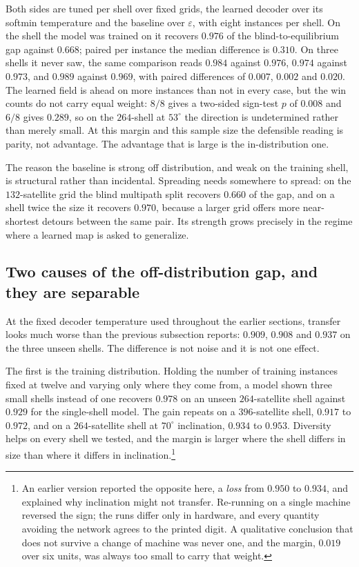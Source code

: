 \documentclass[journal]{IEEEtran}
\begin{document}
Both sides are tuned per shell over fixed grids, the learned decoder over its softmin temperature
and the baseline over $\varepsilon$, with eight instances per shell. On the shell the model was
trained on it recovers $0.976$ of the blind-to-equilibrium gap against $0.668$; paired per instance the median difference is $0.310$. On three shells it never saw, the same comparison reads $0.984$
against $0.976$, $0.974$ against $0.973$, and $0.989$ against $0.969$, with paired differences of
$0.007$, $0.002$ and $0.020$. The learned field is ahead on more instances than not in every case,
but the win counts do not carry equal weight: $8/8$ gives a two-sided sign-test $p$ of $0.008$ and
$6/8$ gives $0.289$, so on the $264$-shell at $53^\circ$ the direction is undetermined rather than
merely small. At this margin and this sample size the defensible reading is parity, not advantage.
The
advantage that is large is the in-distribution one.

The reason the baseline is strong off distribution, and weak on the training shell, is structural
rather than incidental. Spreading needs somewhere to spread: on the $132$-satellite grid the
blind multipath split recovers $0.660$ of the gap, and on a shell twice the size it recovers
$0.970$, because a larger grid offers more near-shortest detours between the same pair. Its
strength grows precisely in the regime where a learned map is asked to generalize.

\subsection{Two causes of the off-distribution gap, and they are separable}\label{sec:two-causes}

At the fixed decoder temperature used throughout the earlier sections, transfer looks much worse
than the previous subsection reports: $0.909$, $0.908$ and $0.937$ on the three unseen shells.
The difference is not noise and it is not one effect.

The first is the training distribution. Holding the number of training instances fixed at twelve and varying only where they come from, a model shown three small shells instead of one recovers $0.978$ on an unseen $264$-satellite shell against $0.929$ for the single-shell model. The gain repeats on a $396$-satellite shell, $0.917$ to $0.972$, and on a $264$-satellite shell at $70^\circ$ inclination, $0.934$ to $0.953$. Diversity helps on every shell we tested, and the margin is larger where the shell differs in size than where it differs in inclination.\footnote{An earlier version reported the opposite here, a \emph{loss} from $0.950$ to
$0.934$, and explained why inclination might not transfer. Re-running on a single machine reversed
the sign; the runs differ only in hardware, and every quantity avoiding the network agrees to the
printed digit. A qualitative conclusion that does not survive a change of machine was never one,
and the margin, $0.019$ over six units, was always too small to carry that weight.}
\end{document}
